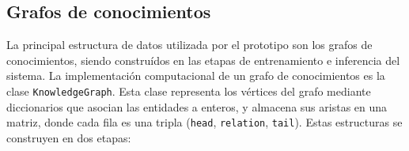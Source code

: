 





\subsection{Grafos de conocimientos}
La principal estructura de datos utilizada por el prototipo son los grafos
de conocimientos, siendo constru\'idos en las etapas de entrenamiento e inferencia
del sistema.
La implementaci\'on computacional de un grafo de conocimientos es la clase \texttt{KnowledgeGraph}. Esta
clase representa los v\'ertices del grafo mediante diccionarios que asocian las entidades a enteros, y almacena sus
aristas en una matriz, donde cada fila es una tripla (\texttt{head}, \texttt{relation}, \texttt{tail}).
Estas estructuras se construyen en dos etapas:

